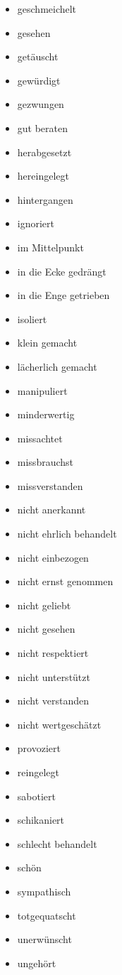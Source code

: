 \begin{multicols}{2}
\begin{itemize}
    \item geschmeichelt
    \item gesehen
    \item getäuscht
    \item gewürdigt
    \item gezwungen
    \item gut beraten
    \item herabgesetzt
    \item hereingelegt
    \item hintergangen
    \item ignoriert
    \item im Mittelpunkt
    \item in die Ecke gedrängt
    \item in die Enge getrieben
    \item isoliert
    \item klein gemacht
    \item lächerlich gemacht
    \item manipuliert
    \item minderwertig
    \item missachtet
    \item missbrauchst
    \item missverstanden
    \item nicht anerkannt
    \item nicht ehrlich behandelt
    \item nicht einbezogen
    \item nicht ernst genommen
    \item nicht geliebt
    \item nicht gesehen
    \item nicht respektiert
    \item nicht unterstützt
    \item nicht verstanden
    \item nicht wertgeschätzt
    \item provoziert
    \item reingelegt
    \item sabotiert
    \item schikaniert
    \item schlecht behandelt
    \item schön
    \item sympathisch
    \item totgequatscht
    \item unerwünscht
    \item ungehört

\end{itemize}
\end{multicols}
